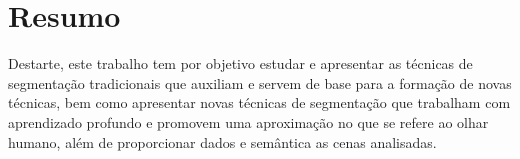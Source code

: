 \section*{Resumo}


Destarte, este trabalho tem por objetivo estudar e apresentar as técnicas de segmentação tradicionais que auxiliam e servem de base para a formação de novas técnicas, bem como apresentar novas técnicas de segmentação que trabalham com aprendizado profundo e promovem uma aproximação no que se refere ao olhar humano, além de proporcionar dados e semântica as cenas analisadas. 
